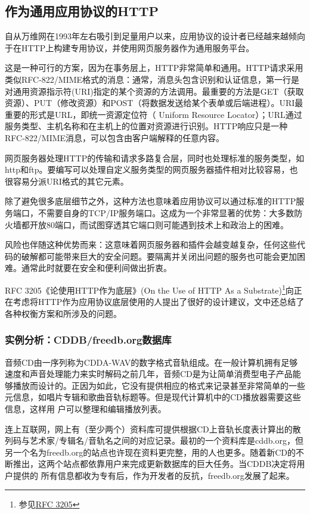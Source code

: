 \documentclass[12pt,oneside]{ctexbook}
\begin{document}
\begin{common-format}
\subsection{作为通用应用协议的HTTP}
自从万维网在1993年左右吸引到足量用户以来，应用协议的设计者已经越来越倾向于在HTTP上构建专用协议，并使用网页服务器作为通用服务平台。

这是一种可行的方案，因为在事务层上，HTTP非常简单和通用。HTTP请求采用类似RFC-822/MIME格式的消息：通常，消息头包含识别和认证信息，第一行是对通用资源指示符(URI)指定的某个资源的方法调用。最重要的方法是GET（获取资源）、PUT（修改资源）和POST（将数据发送给某个表单或后端进程）。URI最重要的形式是URL，即统一资源定位符（ Uniform Resource Locator）；URL通过服务类型、主机名称和在主机上的位置对资源进行识别。HTTP响应只是一种RFC-822/MIME消息，可以包含由客户端解释的任意内容。

网页服务器处理HTTP的传输和请求多路复合层，同时也处理标准的服务类型，如http和ftp。要编写可以处理自定义服务类型的网页服务器插件相对比较容易，也很容易分派URI格式的其它元素。

除了避免很多底层细节之外，这种方法也意味着应用协议可以通过标准的HTTP服务端口，不需要自身的TCP/IP服务端口。这成为一个非常显著的优势：大多数防火墙都开放80端口，而试图穿透其它端口则可能遇到技术上和政治上的困难。

风险也伴随这种优势而来：这意味着网页服务器和插件会越变越复杂，任何这些代码的破解都可能带来巨大的安全问题。要隔离并关闭出问题的服务也可能会更加困难。通常此时就要在安全和便利间做出折衷。

RFC 3205《论使用HTTP作为底层》(On the Use of HTTP As a Substrate)\footnote{参见\href{http://www.faqs.org/rfcs/rfc3205.html}{RFC 3205}}向正在考虑将HTTP作为应用协议底层使用的人提出了很好的设计建议，文中还总结了各种权衡方案和所涉及的问题。

\subsubsection{实例分析：CDDB/freedb.org数据库}
音频CD由一序列称为CDDA-WAV的数字格式音轨组成。在一般计算机拥有足够速度和声音处理能力来实时解码之前几年，音频CD是为让简单消费型电子产品能够播放而设计的。正因为如此，它没有提供相应的格式来记录甚至非常简单的一些元信息，如唱片专辑和歌曲音轨标题等。但是现代计算机中的CD播放器需要这些信息，这样用
户可以整理和编辑播放列表。

连上互联网，网上有（至少两个）资料库可提供根据CD上音轨长度表计算出的散列码与艺术家/专辑名/音轨名之间的对应记录。最初的一个资料库是cddb.org，但另一个名为freedb.org的站点也许现在资料更完整，用的人也更多。随着新CD的不断推出，这两个站点都依靠用户来完成更新数据库的巨大任务。当CDDB决定将用户提供的
所有信息都收为专有后，作为开发者的反抗，freedb.org发展了起来。


\end{common-format}
\end{document}
